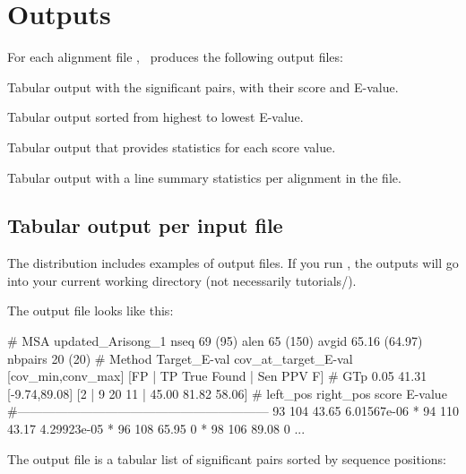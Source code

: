 \label{section:outputs}
\setcounter{footnote}{0}
\section{Outputs}

For each alignment file , \rscape\, produces the
following output files:

\begin{sreitems}{}
\item[\emprog{rnafile.out}] Tabular output with the significant pairs,
  with their score and E-value.
%
\item[\emprog{rnafile.sorted.out}] Tabular output sorted from highest to
  lowest E-value.
%
\item[\emprog{rnafile.roc}] Tabular output that provides statistics for 
each score value.
%
\item[\emprog{rnafile.sum}] Tabular output with a line summary statistics
  per alignment in the file.
%
\end{sreitems}

\subsection{Tabular output per input file}

The distribution includes examples of output files. If you
run \rscape, the outputs will go into your current working directory
(not necessarily tutorials/).

The output file  looks like this:

\begin{sreoutput}
# MSA updated_Arisong_1 nseq 69 (95) alen 65 (150) avgid 65.16 (64.97) nbpairs 20 (20)
# Method Target_E-val cov_at_target_E-val [cov_min,conv_max] [FP | TP True Found | Sen PPV F] 
# GTp    0.05         41.31               [-9.74,89.08]     [2 | 9 20 11 | 45.00 81.82 58.06] 
#       left_pos       right_pos        score   E-value
#------------------------------------------------------------
                93             104      43.65   6.01567e-06
*               94             110      43.17   4.29923e-05
*               96             108      65.95   0
*               98             106      89.08   0
...
\end{sreoutput}
The output file is a tabular list of significant pairs sorted by sequence positions:

